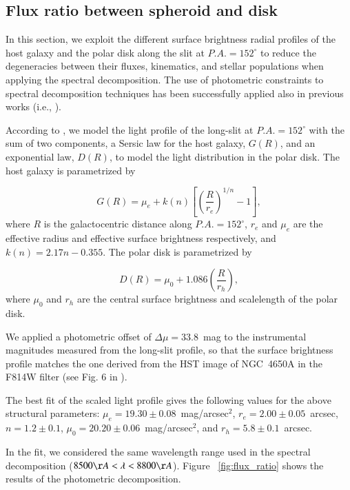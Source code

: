 \documentclass{aa}
\begin{document}
\subsection{Flux ratio between spheroid and disk}
\label{sec:flux_ratio}


In this section, we exploit the different surface brightness radial
profiles of the host galaxy and the polar disk along the slit at
$P.A.=152^{\circ}$ to reduce the degeneracies between their fluxes,
kinematics, and stellar populations when applying the spectral
decomposition. The use of photometric constraints to spectral
decomposition techniques has been successfully applied also in
previous works (i.e., \citealt{Johnston+12}).
  
According to \citet{Iodice+02}, we model the light profile of the
long-slit at $P.A.=152^{\circ}$ with the sum of two components, a
Sersic law for the host galaxy, $G(R)$, and an exponential law,
$D(R)$, to model the light distribution in the polar disk.  The host
galaxy is parametrized by

\begin{equation}
G(R) = \mu_e + k(n) \left[ \left( \frac{R}{r_e}\right)^{1/n} -1\right],
\end{equation}
where $R$ is the galactocentric distance along $P.A.=152^{\circ}$,
$r_e$ and $\mu_e$ are the effective radius and effective surface
brightness respectively, and $k(n)=2.17 n - 0.355$. The polar disk is
parametrized by


\begin{equation}
D(R)=  \mu_0 + 1.086 \left( \frac{R}{r_h}\right),
\end{equation}
where $\mu_0$ and $r_h$ are the central surface brightness and
scalelength of the polar disk.

We applied a photometric offset of $\Delta \mu = 33.8$~mag to the
instrumental magnitudes measured from the long-slit profile, so that
the surface brightness profile matches the one derived from the HST
image of NGC~4650A in the F814W filter (see Fig. 6 in
\citealt{Iodice+02}).

The best fit of the scaled light profile gives the following values
for the above structural parameters: $\mu_e= 19.30 \pm
0.08$~mag/arcsec$^2$, $r_e = 2.00 \pm 0.05$~arcsec, $n = 1.2 \pm 0.1$,
$\mu_0 = 20.20 \pm 0.06$~mag/arcsec$^2$, and $r_h = 5.8 \pm 0.1$~arcsec.

In the fit, we considered the same wavelength range used in the
spectral decomposition ($8500 \AA < \lambda < 8800 \AA$).
Figure ~\ref{fig:flux_ratio} shows the results of the photometric
decomposition.
\end{document}
